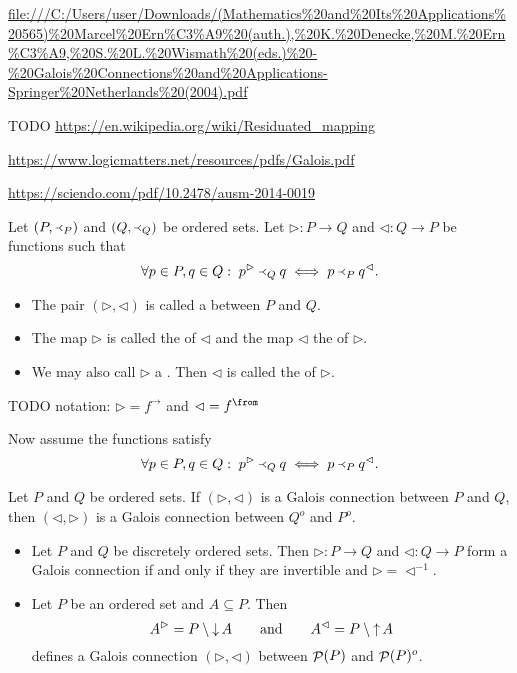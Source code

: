 \url{file:///C:/Users/user/Downloads/(Mathematics%20and%20Its%20Applications%20565)%20Marcel%20Ern%C3%A9%20(auth.),%20K.%20Denecke,%20M.%20Ern%C3%A9,%20S.%20L.%20Wismath%20(eds.)%20-%20Galois%20Connections%20and%20Applications-Springer%20Netherlands%20(2004).pdf}

TODO \url{https://en.wikipedia.org/wiki/Residuated_mapping}

\url{https://www.logicmatters.net/resources/pdfs/Galois.pdf}

\url{https://sciendo.com/pdf/10.2478/ausm-2014-0019}

\begin{definition}
Let $\left( P,\Yleft_P \right)$ and $\left( Q,\Yleft_Q \right)$ be ordered sets. Let $\rhd: P\to Q$ and $\lhd: Q \to P$ be functions such that
\[ \forall p\in P, q\in Q: \; p^\rhd \Yleft_Q q \iff p \Yleft_P q^\lhd. \]
\begin{itemize}
\item The pair $(\rhd, \lhd)$ is called a  between $P$ and $Q$.
\item The map $\rhd$ is called the  of $\lhd$ and the map $\lhd$ the  of $\rhd$.
\item We may also call $\rhd$ a . Then $\lhd$ is called the  of $\rhd$.
\end{itemize}

TODO notation: $\rhd = f^\to$ and $\lhd = f^\from$

Now assume the functions satisfy
\[ \forall p\in P, q\in Q: \; p^\rhd \Yleft_Q q \iff p \Yleft_P q^\lhd. \]
\end{definition}

\begin{lemma}
Let $P$ and $Q$ be ordered sets. If $(\rhd, \lhd)$ is a Galois connection between $P$ and $Q$, then $(\lhd, \rhd)$ is a Galois connection between $Q^o$ and $P^o$.
\end{lemma}

\begin{example}
\begin{itemize}
\item Let $P$ and $Q$ be discretely ordered sets. Then $\rhd: P\to Q$ and $\lhd: Q \to P$ form a Galois connection if and only if they are invertible and $\rhd = \lhd^{-1}$.
\item Let $P$ be an ordered set and $A\subseteq P$. Then
\[ A^\rhd = P\setminus \mathop{\downarrow} A \qquad \text{and} \qquad A^\lhd = P\setminus \mathop{\uparrow} A \]
defines a Galois connection $(\rhd, \lhd)$ between $\mathop{\mathcal{P}}(P)$ and $\mathop{\mathcal{P}}(P)^o$.
\end{itemize}
\end{example}

